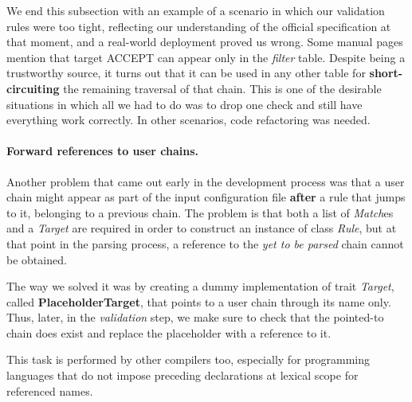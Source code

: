 We end this subsection with an example of a scenario in which our validation
rules were too tight, reflecting our understanding of the official
specification at that moment, and a real-world deployment proved us wrong.
Some manual pages mention that target ACCEPT can appear only in the
\emph{filter} table.  Despite being a trustworthy source, it turns out that it
can be used in any other table for \textbf{short-circuiting} the remaining
traversal of that chain.  This is one of the desirable situations in which all
we had to do was to drop one check and still have everything work correctly.
In other scenarios, code refactoring was needed.

\paragraph{Forward references to user chains.}
Another problem that came out early in the development process was that a user
chain might appear as part of the input configuration file \textbf{after} a
rule that jumps to it, belonging to a previous chain.  The problem is that both
a list of \emph{Match}es and a \emph{Target} are required in order to construct
an instance of class \emph{Rule}, but at that point in the parsing process, a
reference to the \emph{yet to be parsed} chain cannot be obtained.

The way we solved it was by creating a dummy implementation of trait
\emph{Target}, called \textbf{PlaceholderTarget}, that points to a user chain
through its name only.  Thus, later, in the \emph{validation} step, we make
sure to check that the pointed-to chain does exist and replace the placeholder
with a reference to it.

This task is performed by other compilers too, especially for programming
languages that do not impose preceding declarations at lexical scope for
referenced names.

